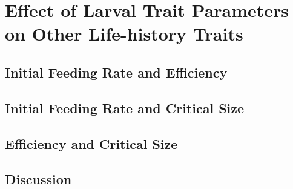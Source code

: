 \chapter{Effect of Larval Trait Parameters on Other Life-history Traits}

\section{Initial Feeding Rate and Efficiency}

\section{Initial Feeding Rate and Critical Size}

\section{Efficiency and Critical Size}

\section{Discussion}


\pagebreak
\renewcommand\bibname{{References}}


